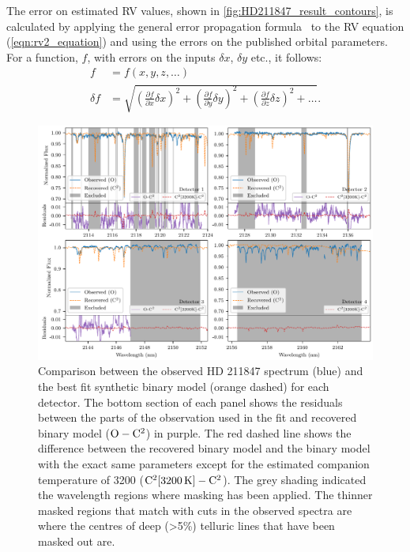 The error on estimated {RV} values, shown in \cref{fig:HD211847_result_contours}, is calculated by applying the general error propagation formula~\citep{ku_notes_1966} to the {RV} equation (\cref{eqn:rv2_equation}) and using the errors on the published orbital parameters.
For a function, \(f\), with errors on the inputs \(\delta x\), \(\delta y\) etc., it follows:
\begin{align}
f &= f(x, y, z, \ldots)\\
\delta f &= \sqrt{{\left( \frac{\partial f}{\partial x} \delta x\right)}^2 + {\left(\frac{\partial f}{\partial y} \delta y\right)}^2 + {\left(\frac{\partial f}{\partial z} \delta z\right)}^2 + \ldots}.
\end{align}


\begin{figure}
    \centering
    \includegraphics[width=0.7\linewidth]{figures/companion_recovery/visualize_result_residuals}
    \caption[Comparison between observation of {HD 211847} and the best fit synthetic binary model.]{Comparison between the observed {HD 211847} spectrum (blue) and the best fit synthetic binary model (orange dashed) for each detector.
        The bottom section of each panel shows the residuals between the parts of the observation used in the \textchisquared{} fit and recovered binary model (\(\rm O-C^2\)) in purple.
        The red dashed line shows the difference between the recovered binary model and the binary model with the exact same parameters except for the estimated companion temperature of 3200\K{} (\(\rm C^2[3200\,\si{\kelvin}{}]- C^2\)).
        The grey shading indicated the wavelength regions where masking has been applied.
        The thinner masked regions that match with cuts in the observed spectra are where the centres of deep (>5\%) telluric lines that have been masked out are.}
    \label{fig:visualinspection-hd2118471}
\end{figure}


